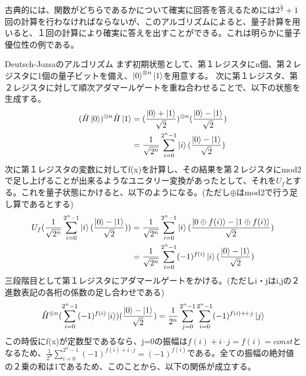 \documentclass[a4paper,10.5pt]{article}
\numberwithin{equation}{section}
\begin{document}
古典的には、関数がどちらであるかについて確実に回答を答えるためには$2^{\frac{n}{2}}+1$回の計算を行わなければならないが、このアルゴリズムによると、量子計算を用いると、１回の計算により確実に答えを出すことができる。これは明らかに量子優位性の例である。
\begin{setupbox}{Deutsch-Jozsaのアルゴリズム}
まず初期状態として、第１レジスタにn個、第２レジスタに1個の量子ビットを備え、$\ket{0}^{\otimes n}\ket{1}$を用意する。
次に第１レジスタ、第２レジスタに対して順次アダマールゲートを重ね合わせることで、以下の状態を生成する。
 \begin{equation}\begin{split}
     (\hat{H}\ket{0})^{\otimes n}\hat{H}\ket{1} 
     &= (\frac{\ket{0}+\ket{1}}{\sqrt{2}})^{\otimes n}(\frac{\ket{0}-\ket{1}}{\sqrt{2}})\\
     &= \frac{1}{\sqrt{2^{n}}}
     \sum_{i=0}^{2^{n}-1}\ket{i}(\frac{\ket{0}-\ket{1}}{\sqrt{2}})
 \end{split} \end{equation}
次に第１レジスタの変数に対してf(x)を計算し、その結果を第２レジスタにmod2で足し上げることが出来るようなユニタリー変換があったとして、それを$U_{f}$とする。これを量子状態にかけると、以下のようになる。(ただし$\oplus$はmod2で行う足し算であるとする)
  \begin{equation}\begin{split}
      U_{f}(\frac{1}{\sqrt{2^{n}}}\sum_{i=0}^{2^{n}-1}\ket{i}(\frac{\ket{0}-\ket{1}}{\sqrt{2}}))
      &=\frac{1}{\sqrt{2^{n}}}\sum_{i=0}^{2^{n}-1}\ket{i}(\frac{\ket{0\oplus f(i)}-\ket{1 \oplus f(i)}}{\sqrt{2}})\\
      &=\frac{1}{\sqrt{2^{n}}}\sum_{i=0}^{2^{n}-1}(-1)^{f(i)}\ket{i}(\frac{\ket{0}-\ket{1}}{\sqrt{2}})
  \end{split} \end{equation}
三段階目として第１レジスタにアダマールゲートをかける。(ただしi・jはi,jの２進数表記の各桁の係数の足し合わせである)
\begin{equation}\begin{split}
    \hat{H}^{\otimes n}(\sum_{i=0}^{2^{n}-1}(-1)^{f(i)}\ket{i})(\frac{\ket{0}-\ket{1}}{\sqrt{2}})
    =\frac{1}{2^{n}}  \sum_{j=0}^{2^{n}-1} \sum_{i=0}^{2^{n}-1}
    (-1)^{f(i)+i \cdot j}\ket{j}
\end{split} \end{equation}
この時仮にf(x)が定数型であるなら、j=0の振幅は$f(i)+i \cdot j = f(i) =const$となるため、$\frac{1}{2^{n}}\sum_{i=0}^{2^{n}-1}(-1)^{f(i)+i \cdot j} = (-1)^{f(i)}$である。全ての振幅の絶対値の２乗の和は1であるため、このことから、以下の関係が成立する。

\end{setupbox}
\end{document}

